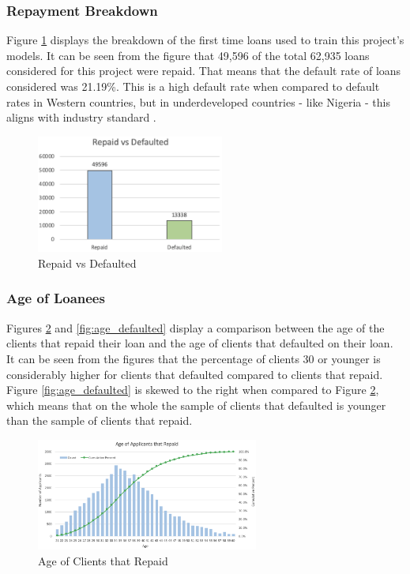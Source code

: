 \subsubsection{Repayment Breakdown}

Figure \ref{fig:defaulted} displays the breakdown of the first time loans used to train this project's models. It can be seen from the figure that 49,596 of the total 62,935 loans considered for this project were repaid. That means that the default rate of loans considered was 21.19\%. This is a high default rate when compared to default rates in Western countries, but in underdeveloped countries - like Nigeria - this aligns with industry standard \parencite{Default}.

\vspace{10 pt}

\begin{figure}[!htb]
\centering
\includegraphics[width=0.55\textwidth]{images/payments.png}
\caption{Repaid vs Defaulted}
\label{fig:defaulted}
\end{figure}

\subsubsection{Age of Loanees}

Figures \ref{fig:age_paid} and \ref{fig:age_defaulted} display a comparison between the age of the clients that repaid their loan and the age of clients that defaulted on their loan. It can be seen from the figures that the percentage of clients 30 or younger is considerably higher for clients that defaulted compared to clients that repaid. Figure \ref{fig:age_defaulted} is skewed to the right when compared to Figure \ref{fig:age_paid}, which means that on the whole the sample of clients that defaulted is younger than the sample of clients that repaid.   

\vspace{10 pt}

\begin{figure}[!htb]
\centering
\includegraphics[width=0.65\textwidth]{images/repaid_age.png}
\caption{Age of Clients that Repaid}
\label{fig:age_paid}
\end{figure}

